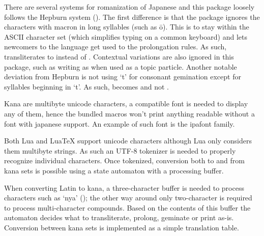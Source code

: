 
There are several systems for romanization of Japanese and this package loosely follows the Hepburn system ().
The first difference is that the package ignores the characters with macron in long syllables (such as \jchar ō).
This is to stay within the ASCII character set (which simplifies typing on a common keyboard) and lets newcomers to the language get used to the prolongation rules.
As such,  transliterates to  instead of .
Contextual variations are also ignored in this package, such as writing  as  when used as a topic particle.
Another notable deviation from Hepburn is not using `t' for consonant gemination except for syllables beginning in `t'. As such,  becomes  and not .


Kana are multibyte unicode characters, a compatible font is needed to display any of them, hence the bundled macros won't print anything readable without a font with japanese support.
An example of such font is the ipafont family.

Both Lua and Lua\TeX \kern3pt support unicode characters although Lua only considers them multibyte strings. As such an UTF-8 tokenizer is needed to properly recognize individual characters.
Once tokenized, conversion both to and from kana sets is possible using a state automaton with a processing buffer.

When converting Latin to kana, a three-character buffer is needed to process characters such as `nya' (); the other way around only two-character is required to process multi-character compounds.
Based on the contents of this buffer the automaton decides what to transliterate, prolong, geminate or print as-is. Conversion between kana sets is implemented as a simple translation table.

\bye
